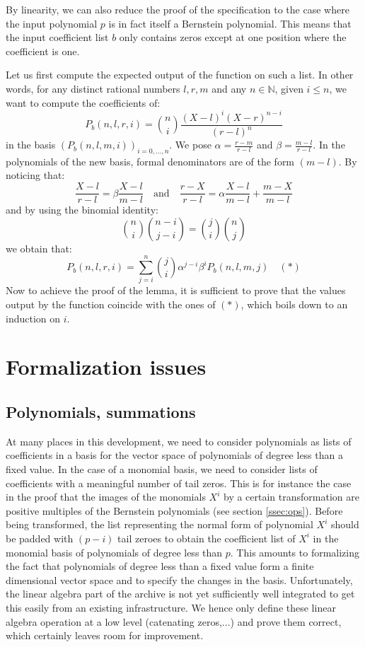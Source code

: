 \documentclass{mscs}
\begin{document}
By linearity, we can also reduce the proof of the 
specification to the case where the input polynomial $p$ is in fact
itself a Bernstein polynomial. This means that the input coefficient
list $b$ only contains zeros except at one position where the
coefficient is one.

Let us first compute the expected output of the  function on
such a list. In other words, for any distinct rational numbers $l,
r, m$ and any $n\in \mathbb{N}$, given $i \leq n$, we want to compute
the coefficients of:
$$P_b(n, l, r, i) = \binom{n}{i} \frac{(X - l)^i(X - r)^{n -i}}
{(r - l)^n}$$ in the basis $(P_b(n, l, m, i))_{i = 0, \dots, n}$.
We pose
$\alpha = \frac{r -  m}{r - l}$ and $\beta = \frac{m - l}{r - l}$.
In the polynomials of the new basis, formal denominators are of the
form $(m - l)$. By noticing that:
$$\frac{X - l}{r-l} = \beta \frac{X - l}{m - l} \quad \textrm{and} \quad
\frac{r - X}{r - l} = \alpha\frac{X - l}{m - l} +\frac{m - X}{m - l}$$
and by using the binomial identity:
$$\binom{n}{i}\binom{n - i}{j - i}  = \binom{j}{i}\binom{n}{j}$$
we obtain that:
$$P_b(n, l, r, i) =
\sum_{j = i}^n\binom{j}{i}\alpha^{j-i}\beta^i P_b(n, l, m, j)  \quad (*)$$
Now to achieve the proof of the  lemma, it is
sufficient to prove that the values output by the  function
coincide with the ones of $(*)$, which boils down to an induction on $i$.

\section{Formalization issues}
\label{sec:formal}

\subsection{Polynomials, summations}

At many places in this development, we need to consider polynomials as
lists of
coefficients in a basis for the vector space of polynomials of degree
less than a fixed value. In the case of a monomial basis, we need to
consider lists of coefficients with a meaningful number of tail
zeros. This is for instance the case in the proof that the images of
the monomials \(X^i\) by a certain transformation are positive
multiples of the Bernstein polynomials (see section \ref{ssec:ops}).
Before being transformed, the list representing the normal form of
polynomial \(X^i\) should be padded with $(p - i)$ tail zeroes to
obtain the coefficient list of \(X^i\) in the monomial basis of
polynomials of degree less than $p$. This
amounts to formalizing the fact that polynomials of degree less than a
fixed value form a finite dimensional vector space and to specify the
changes in the basis. Unfortunately, the linear algebra part of the
\ssr{} archive is not yet sufficiently well integrated to get this
easily from an existing infrastructure. We hence only define these
linear algebra operation at a low level (catenating zeros,...) and
prove them correct, which certainly leaves room for improvement.
\end{document}
